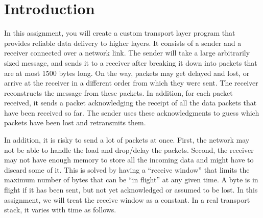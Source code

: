 \documentclass{article}
\begin{document}
\section{Introduction}

In this assignment, you will create a custom transport layer program that provides reliable data delivery to higher layers. It consists of a sender and a receiver connected over a network link. The sender will take a large arbitrarily sized message, and sends it to a receiver after breaking it down into packets that are at most 1500 bytes long. On the way, packets may get delayed and lost, or arrive at the receiver in a different order from which they were sent. The receiver reconstructs the message from these packets. In addition, for each packet received, it sends a packet acknowledging the receipt of all the data packets that have been received so far. The sender uses these acknowledgments to guess which packets have been lost and retransmits them.

In addition, it is risky to send a lot of packets at once. First, the network may not be able to handle the load and drop/delay the packets. Second, the receiver may not have enough memory to store all the incoming data and might have to discard some of it. This is solved by having a ``receive window'' that limits the maximum number of bytes that can be ``in flight'' at any given time. A byte is in flight if it has been sent, but not yet acknowledged or assumed to be lost. In this assignment, we will treat the receive window as a constant. In a real transport stack, it varies with time as follows.
\end{document}

